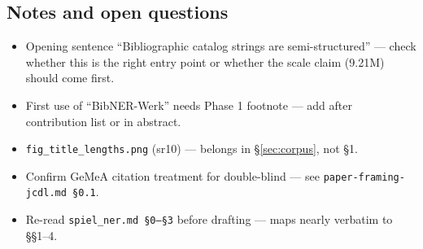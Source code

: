 \subsection*{Notes and open questions}
\begin{itemize}
    \item Opening sentence ``Bibliographic catalog strings are semi-structured''
          --- check whether this is the right entry point or whether
          the scale claim (9.21M) should come first.
    \item First use of ``BibNER-Werk'' needs Phase 1 footnote --- add after
          contribution list or in abstract.
    \item \texttt{fig\_title\_lengths.png} (sr10) --- belongs in
          §\ref{sec:corpus}, not §1.
    \item Confirm GeMeA citation treatment for double-blind ---
          see \texttt{paper-framing-jcdl.md §0.1}.
    \item Re-read \texttt{spiel\_ner.md §0--§3} before drafting ---
          maps nearly verbatim to §§1--4.
\end{itemize}

